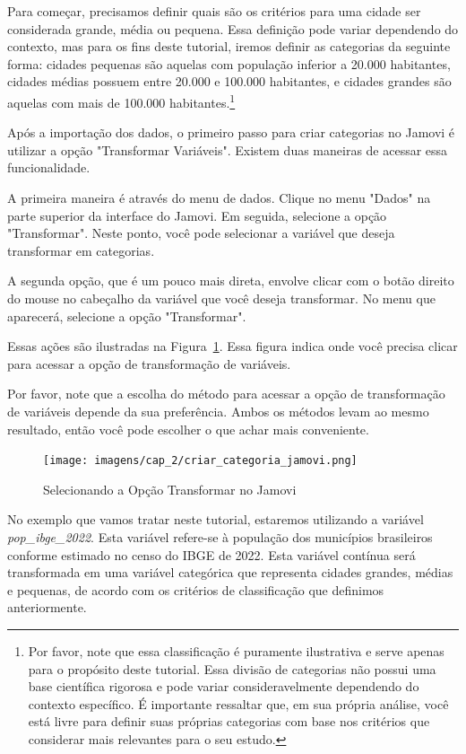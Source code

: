 Para começar, precisamos definir quais são os critérios para uma cidade ser considerada grande, média ou pequena. Essa definição pode variar dependendo do contexto, mas para os fins deste tutorial, iremos definir as categorias da seguinte forma: cidades pequenas são aquelas com população inferior a 20.000 habitantes, cidades médias possuem entre 20.000 e 100.000 habitantes, e cidades grandes são aquelas com mais de 100.000 habitantes.\footnote{Por favor, note que essa classificação é puramente ilustrativa e serve apenas para o propósito deste tutorial. Essa divisão de categorias não possui uma base científica rigorosa e pode variar consideravelmente dependendo do contexto específico. É importante ressaltar que, em sua própria análise, você está livre para definir suas próprias categorias com base nos critérios que considerar mais relevantes para o seu estudo.}

Após a importação dos dados, o primeiro passo para criar categorias no Jamovi é utilizar a opção "Transformar Variáveis". Existem duas maneiras de acessar essa funcionalidade.

A primeira maneira é através do menu de dados. Clique no menu "Dados" na parte superior da interface do Jamovi. Em seguida, selecione a opção "Transformar". Neste ponto, você pode selecionar a variável que deseja transformar em categorias.

A segunda opção, que é um pouco mais direta, envolve clicar com o botão direito do mouse no cabeçalho da variável que você deseja transformar. No menu que aparecerá, selecione a opção "Transformar".

Essas ações são ilustradas na Figura~\ref{fig:criar_categoria_jamovi}. Essa figura indica onde você precisa clicar para acessar a opção de transformação de variáveis.

Por favor, note que a escolha do método para acessar a opção de transformação de variáveis depende da sua preferência. Ambos os métodos levam ao mesmo resultado, então você pode escolher o que achar mais conveniente.

\begin{figure}[H]
    \centering
    \caption{Selecionando a Opção Transformar no Jamovi}
    \texttt{[image: imagens/cap\_2/criar\_categoria\_jamovi.png]}
    \label{fig:criar_categoria_jamovi}
\end{figure}

No exemplo que vamos tratar neste tutorial, estaremos utilizando a variável \textit{pop\_ibge\_2022}. Esta variável refere-se à população dos municípios brasileiros conforme estimado no censo do IBGE de 2022. Esta variável contínua será transformada em uma variável categórica que representa cidades grandes, médias e pequenas, de acordo com os critérios de classificação que definimos anteriormente.

